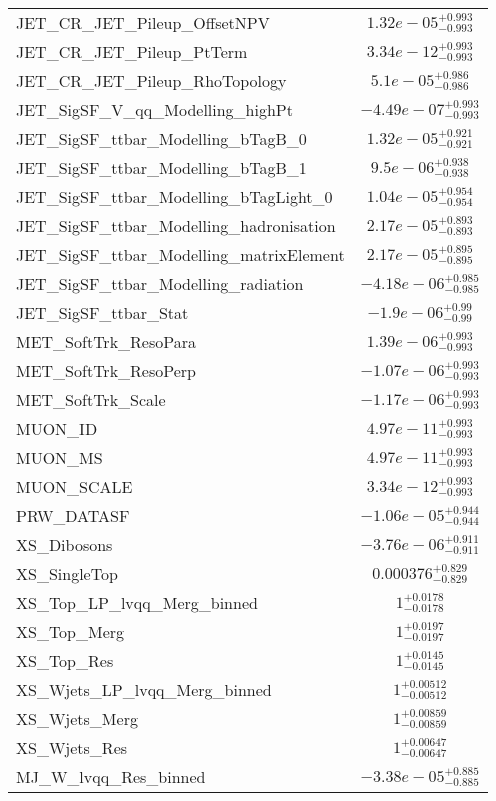 \begin{tabular}{|l|c|}
JET\_CR\_JET\_Pileup\_OffsetNPV & $1.32e-05^{+0.993}_{-0.993}$ \\
JET\_CR\_JET\_Pileup\_PtTerm & $3.34e-12^{+0.993}_{-0.993}$ \\
JET\_CR\_JET\_Pileup\_RhoTopology & $5.1e-05^{+0.986}_{-0.986}$ \\
JET\_SigSF\_V\_qq\_Modelling\_highPt & $-4.49e-07^{+0.993}_{-0.993}$ \\
JET\_SigSF\_ttbar\_Modelling\_bTagB\_0 & $1.32e-05^{+0.921}_{-0.921}$ \\
JET\_SigSF\_ttbar\_Modelling\_bTagB\_1 & $9.5e-06^{+0.938}_{-0.938}$ \\
JET\_SigSF\_ttbar\_Modelling\_bTagLight\_0 & $1.04e-05^{+0.954}_{-0.954}$ \\
JET\_SigSF\_ttbar\_Modelling\_hadronisation & $2.17e-05^{+0.893}_{-0.893}$ \\
JET\_SigSF\_ttbar\_Modelling\_matrixElement & $2.17e-05^{+0.895}_{-0.895}$ \\
JET\_SigSF\_ttbar\_Modelling\_radiation & $-4.18e-06^{+0.985}_{-0.985}$ \\
JET\_SigSF\_ttbar\_Stat & $-1.9e-06^{+0.99}_{-0.99}$ \\
MET\_SoftTrk\_ResoPara & $1.39e-06^{+0.993}_{-0.993}$ \\
MET\_SoftTrk\_ResoPerp & $-1.07e-06^{+0.993}_{-0.993}$ \\
MET\_SoftTrk\_Scale & $-1.17e-06^{+0.993}_{-0.993}$ \\
MUON\_ID & $4.97e-11^{+0.993}_{-0.993}$ \\
MUON\_MS & $4.97e-11^{+0.993}_{-0.993}$ \\
MUON\_SCALE & $3.34e-12^{+0.993}_{-0.993}$ \\
PRW\_DATASF & $-1.06e-05^{+0.944}_{-0.944}$ \\
XS\_Dibosons & $-3.76e-06^{+0.911}_{-0.911}$ \\
XS\_SingleTop & $0.000376^{+0.829}_{-0.829}$ \\
XS\_Top\_LP\_lvqq\_Merg\_binned & $1^{+0.0178}_{-0.0178}$ \\
XS\_Top\_Merg & $1^{+0.0197}_{-0.0197}$ \\
XS\_Top\_Res & $1^{+0.0145}_{-0.0145}$ \\
XS\_Wjets\_LP\_lvqq\_Merg\_binned & $1^{+0.00512}_{-0.00512}$ \\
XS\_Wjets\_Merg & $1^{+0.00859}_{-0.00859}$ \\
XS\_Wjets\_Res & $1^{+0.00647}_{-0.00647}$ \\
MJ\_W\_lvqq\_Res\_binned & $-3.38e-05^{+0.885}_{-0.885}$ \\

\end{tabular}
